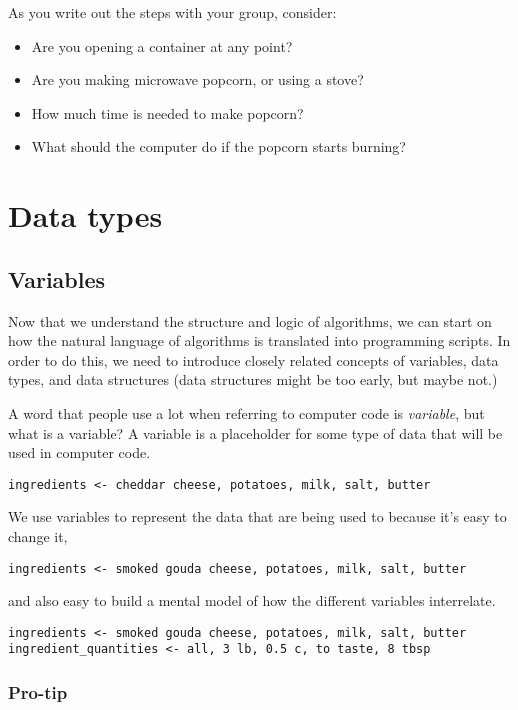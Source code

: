 \documentclass[
]{book}
\providecommand{\tightlist}{%
  \setlength{\itemsep}{0pt}\setlength{\parskip}{0pt}}
\begin{document}
As you write out the steps with your group, consider:

\begin{itemize}
\tightlist
\item
  Are you opening a container at any point?
\item
  Are you making microwave popcorn, or using a stove?
\item
  How much time is needed to make popcorn?
\item
  What should the computer do if the popcorn starts burning?
\end{itemize}

\chapter{Data types}\label{data-types}

\section{Variables}\label{variables}

Now that we understand the structure and logic of algorithms, we can start on how the natural language of algorithms is translated into programming scripts. In order to do this, we need to introduce closely related concepts of variables, data types, and data structures (data structures might be too early, but maybe not.)

A word that people use a lot when referring to computer code is \emph{variable}, but what is a variable? A variable is a placeholder for some type of data that will be used in computer code.

\texttt{ingredients\ \textless{}-\ cheddar\ cheese,\ potatoes,\ milk,\ salt,\ butter}

We use variables to represent the data that are being used to because it's easy to change it,

\texttt{ingredients\ \textless{}-\ smoked\ gouda\ cheese,\ potatoes,\ milk,\ salt,\ butter}

and also easy to build a mental model of how the different variables interrelate.

\begin{verbatim}
ingredients <- smoked gouda cheese, potatoes, milk, salt, butter
ingredient_quantities <- all, 3 lb, 0.5 c, to taste, 8 tbsp
\end{verbatim}

\subsection{Pro-tip}\label{pro-tip}
\end{document}
